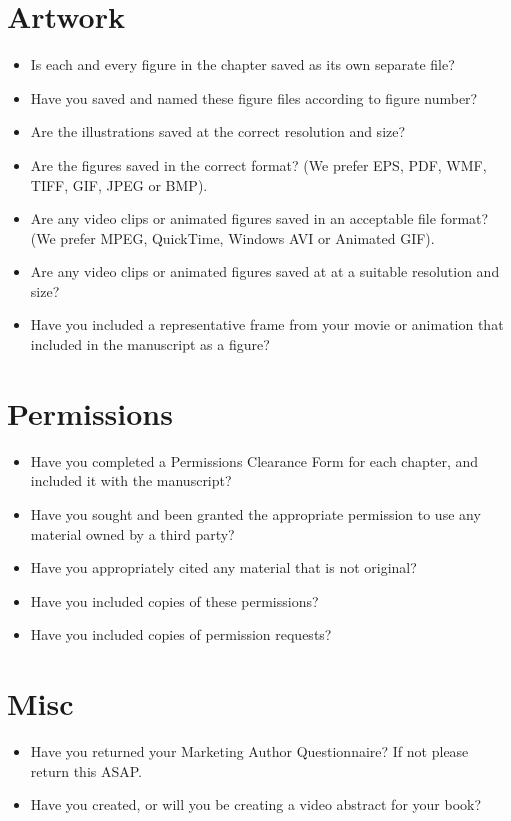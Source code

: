 \section*{Artwork}
\begin{itemize}
\item  Is each and every figure in the chapter saved as its own separate file?


\item  Have you saved and named these figure files according to figure number?

\item  Are the illustrations saved at the correct resolution and size?

\item  Are the figures saved in the correct format? (We prefer  EPS, PDF, WMF, TIFF, GIF, JPEG or BMP).

\item  Are any video clips or animated figures saved in an acceptable file format? (We prefer  MPEG, QuickTime, Windows AVI or Animated GIF).

\item  Are any video clips or animated figures saved at at a suitable resolution and size?

\item  Have you included a representative frame from your movie or animation that included in the manuscript as a figure?
\end{itemize}



\section*{Permissions}
\begin{itemize}
\item  Have you completed a Permissions Clearance  Form for each chapter,  and included it with the manuscript?

\item  Have you sought and been granted the appropriate permission to use any material owned by a third party?

\item  Have you appropriately cited any material that is not original?

\item  Have you included copies of these permissions?

\item  Have you included copies of permission requests?
\end{itemize}


\section*{Misc}
\begin{itemize}
\item  Have you returned your Marketing Author Questionnaire?  If not please return this ASAP.
\item  Have you created, or will you be creating a video abstract for your book?  
\end{itemize}


